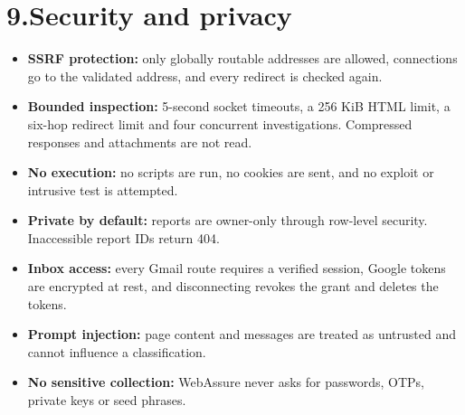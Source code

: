 \documentclass[11pt,a4paper]{article}
\begin{document}
\section{9.\quad Security and privacy}
\begin{itemize}
\item \textbf{SSRF protection:} only globally routable addresses are allowed, connections go to the validated address, and every redirect is checked again.
\item \textbf{Bounded inspection:} 5-second socket timeouts, a 256 KiB HTML limit, a six-hop redirect limit and four concurrent investigations. Compressed responses and attachments are not read.
\item \textbf{No execution:} no scripts are run, no cookies are sent, and no exploit or intrusive test is attempted.
\item \textbf{Private by default:} reports are owner-only through row-level security. Inaccessible report IDs return 404.
\item \textbf{Inbox access:} every Gmail route requires a verified session, Google tokens are encrypted at rest, and disconnecting revokes the grant and deletes the tokens.
\item \textbf{Prompt injection:} page content and messages are treated as untrusted and cannot influence a classification.
\item \textbf{No sensitive collection:} WebAssure never asks for passwords, OTPs, private keys or seed phrases.
\end{itemize}
\end{document}
